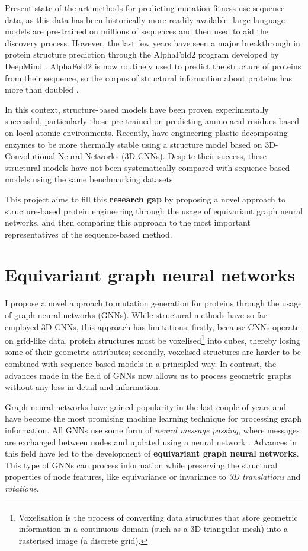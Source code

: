 Present state-of-the-art methods for predicting mutation fitness use sequence data, as this data has been historically more readily available: large language models are pre-trained on millions of sequences and then used to aid the discovery process. However, the last few years have seen a major breakthrough in protein structure prediction through the AlphaFold2 program developed by DeepMind \cite{alphafold}. AlphaFold2 is now routinely used to predict the structure of proteins from their sequence, so the corpus of structural information about proteins has more than doubled \cite{portapardo2022structural}.

In this context, structure-based models have been proven experimentally successful, particularly those pre-trained on predicting amino acid residues based on local atomic environments. Recently, \citet{Lu2022} have engineering plastic decomposing enzymes to be more thermally stable using a structure model based on 3D-Convolutional Neural Networks (3D-CNNs). Despite their success, these structural models have not been systematically compared with sequence-based models using the same benchmarking datasets. 

This project aims to fill this \textbf{research gap} by proposing a novel approach to structure-based protein engineering through the usage of equivariant graph neural networks, and then comparing this approach to the most important representatives of the sequence-based method. 

\section{Equivariant graph neural networks}
I propose a novel approach to mutation generation for proteins through the usage of graph neural networks (GNNs). While structural methods have so far employed 3D-CNNs, this approach has limitations: firstly, because CNNs operate on grid-like data, protein structures must be voxelised\footnote{Voxelisation is the process of converting data structures that store geometric information in a continuous domain (such as a 3D triangular mesh) into a rasterised image (a discrete grid).} into cubes, thereby losing some of their geometric attributes; secondly, voxelised structures are harder to be combined with sequence-based models in a principled way. In contrast, the advances made in the field of GNNs now allows us to process geometric graphs without any loss in detail and information.

Graph neural networks have gained popularity in the last couple of years and have become the most promising machine learning technique for processing graph information. All GNNs use some form of \textit{neural message passing}, where messages are exchanged between nodes and updated using a neural network \citep{gilmer2017neural}. Advances in this field have led to the development of \textbf{equivariant graph neural networks}. This type of GNNs can process information while preserving the structural properties of node features, like equivariance or invariance to \textit{3D translations} and \textit{rotations}.

